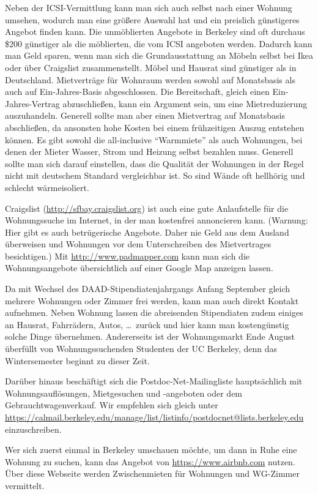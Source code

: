 \documentclass[a4paper]{scrreprt}
\begin{document}
Neben der ICSI-Vermittlung kann man sich auch selbst nach einer
Wohnung umsehen, wodurch man eine größere Auswahl hat und ein
preislich günstigeres Angebot finden kann. Die unmöblierten Angebote
in Berkeley sind oft durchaus \$200 günstiger als die möblierten, die
vom ICSI angeboten werden. Dadurch kann man Geld sparen, wenn man sich
die Grundausstattung an Möbeln selbst bei Ikea oder über Craigslist
zusammenstellt. Möbel und Hausrat sind günstiger als in
Deutschland. Mietverträge für Wohnraum werden sowohl auf Monatsbasis
als auch auf Ein-Jahres-Basis abgeschlossen. Die Bereitschaft,
gleich einen Ein-Jahres-Vertrag abzuschließen, kann ein Argument sein,
um eine Mietreduzierung auszuhandeln. Generell sollte man aber einen Mietvertrag auf Monatsbasis abschließen, da ansonsten hohe Kosten bei einem frühzeitigen Auszug entstehen können.
Es gibt sowohl die all-inclusive
"`Warmmiete"' als auch Wohnungen, bei denen der Mieter Wasser, Strom
und Heizung selbst bezahlen muss. Generell sollte man sich darauf
einstellen, dass die Qualität der Wohnungen in der Regel nicht mit
deutschem Standard vergleichbar ist. So sind Wände oft hellhörig und
schlecht wärmeisoliert.

Craigslist (\url{http://sfbay.craigslist.org}) ist auch eine gute Anlaufstelle für die Wohnungssuche im
Internet, in der man kostenfrei annoncieren kann. (Warnung: Hier gibt
es auch betrügerische Angebote. Daher nie Geld aus dem Ausland
überweisen und Wohnungen vor dem Unterschreiben des Mietvertrages
besichtigen.)
Mit \url{http://www.padmapper.com} kann man sich die Wohnungsangebote
übersichtlich auf einer Google Map anzeigen lassen.

Da mit Wechsel des DAAD-Stipendiatenjahrgangs Anfang September gleich
mehrere Wohnungen oder Zimmer frei werden, kann man auch direkt
Kontakt aufnehmen. Neben Wohnung lassen die abreisenden Stipendiaten
zudem einiges an Hausrat, Fahrrädern, Autos, \dots\ zurück und hier kann
man kostengünstig solche Dinge übernehmen. Andererseits ist der Wohnungsmarkt Ende August \"uberf\"ullt von Wohnungssuchenden Studenten der UC Berkeley, denn das Wintersemester beginnt zu dieser Zeit.

Darüber hinaus beschäftigt sich die Postdoc-Net-Mailingliste
hauptsächlich mit Wohnungsauflösungen, Mietgesuchen und -angeboten
oder dem Gebrauchtwagenverkauf. Wir empfehlen sich gleich unter
\url{https://calmail.berkeley.edu/manage/list/listinfo/postdocnet@lists.berkeley.edu}
einzuschreiben.

Wer sich zuerst einmal in Berkeley umschauen möchte, um dann in Ruhe
eine Wohnung zu suchen, kann das Angebot von
\url{https://www.airbnb.com} nutzen. Über diese Webseite werden 
Zwischenmieten für Wohnungen und WG-Zimmer vermittelt. 
\end{document}

